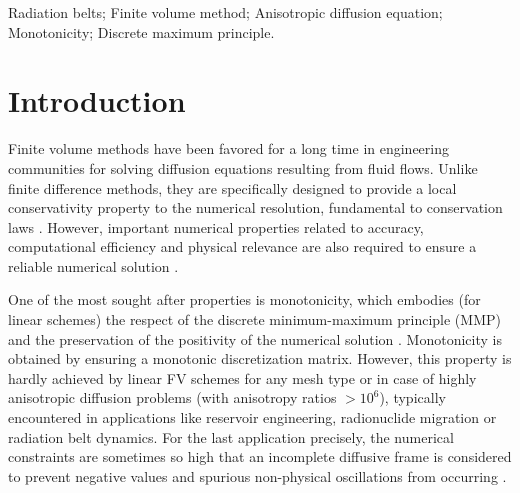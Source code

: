 \documentclass[final,11pt]{elsarticle}
\begin{document}
\begin{frontmatter}
\begin{keyword}
Radiation belts; Finite volume method; Anisotropic diffusion equation; Monotonicity; Discrete maximum principle.
\end{keyword}

\end{frontmatter}
\section{Introduction}

Finite volume methods have been favored for a long time in engineering communities for solving diffusion equations resulting from fluid flows. Unlike finite difference methods, they are specifically designed to provide a local conservativity property to the numerical resolution, fundamental to conservation laws \cite{eymard2000}. However, important numerical properties related to accuracy, computational efficiency and physical relevance are also required to ensure a reliable numerical solution \cite{droniou2014}.

One of the most sought after properties is monotonicity, which embodies (for linear schemes) the respect of the discrete minimum-maximum principle (MMP) and the preservation of the positivity of the numerical solution \cite{droniou2014}. Monotonicity is obtained by ensuring a monotonic discretization matrix. However, this property is hardly achieved by linear FV schemes for any mesh type or in case of highly anisotropic diffusion problems (with anisotropy ratios $>10^6$), typically encountered in applications like reservoir engineering, radionuclide migration or radiation belt dynamics. For the last application precisely, the numerical constraints are sometimes so high that an incomplete diffusive frame is considered to prevent negative values and spurious non-physical oscillations from occurring \cite{varotsou2008,dahmen2020a,dahmen2020b}.
\end{document}

